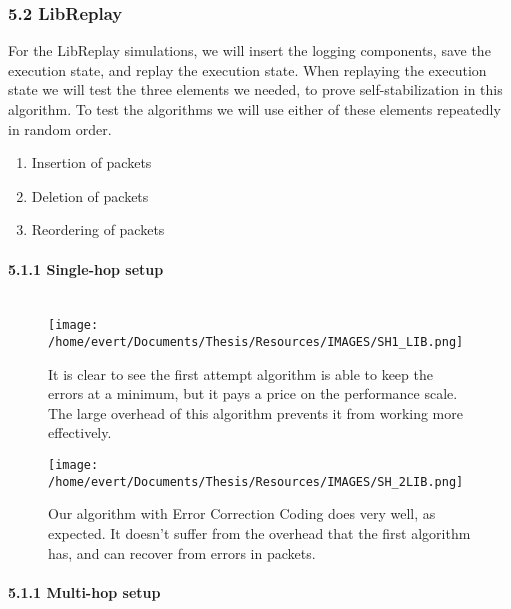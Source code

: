 \subsubsection{5.2 LibReplay}\label{libreplay}

For the LibReplay simulations, we will insert the logging components,
save the execution state, and replay the execution state. When replaying
the execution state we will test the three elements we needed, to prove
self-stabilization in this algorithm. To test the algorithms we will use
either of these elements repeatedly in random order.

\begin{enumerate}
\def\labelenumi{\arabic{enumi}.}
\itemsep1pt\parskip0pt
\item
  Insertion of packets
\item
  Deletion of packets
\item
  Reordering of packets
\end{enumerate}

\paragraph{5.1.1 Single-hop setup\\\\}\label{single-hop-setup-1}

\begin{figure}[htbp]
\centering
\texttt{[image: /home/evert/Documents/Thesis/Resources/IMAGES/SH1\_LIB.png]}
\caption{It is clear to see the first attempt algorithm is able to keep
the errors at a minimum, but it pays a price on the performance scale.
The large overhead of this algorithm prevents it from working more
effectively.}
\end{figure}

\begin{figure}[htbp]
\centering
\texttt{[image: /home/evert/Documents/Thesis/Resources/IMAGES/SH\_2LIB.png]}
\caption{Our algorithm with Error Correction Coding does very well, as
expected. It doesn't suffer from the overhead that the first algorithm
has, and can recover from errors in packets.}
\end{figure}

\paragraph{5.1.1 Multi-hop setup\\\\}\label{multi-hop-setup-1}

